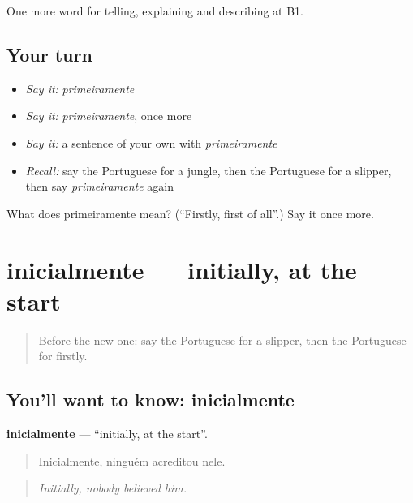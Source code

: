 \begin{grammarlens}[title={What you've built}]
One more word for telling, explaining and describing at B1.
\end{grammarlens}

\subsection*{Your turn}
\begin{itemize}
\raggedright
  \item \emph{Say it:} \emph{primeiramente}
  \item \emph{Say it:} \emph{primeiramente}, once more
  \item \emph{Say it:} a sentence of your own with \emph{primeiramente}
  \item \emph{Recall:} say the Portuguese for a jungle, then the Portuguese for a slipper, then say \emph{primeiramente} again
\end{itemize}

\begin{tcolorbox}[breakable,colback=teal!4,colframe=teal!35!black,title={Before you move on}]
What does primeiramente mean? (\textquotedblleft{}Firstly, first of all\textquotedblright{}.) Say it once more.
\end{tcolorbox}
\section[inicialmente]{inicialmente — initially, at the start}

\label{lesson:PT-C269-inicialmente}



\begin{quote}
Before the new one: say the Portuguese for a slipper, then the Portuguese for firstly.
\end{quote}

\subsection*{You'll want to know: inicialmente}
\textbf{inicialmente} — \textquotedblleft{}initially, at the start\textquotedblright{}.

\begin{quote}
Inicialmente, ninguém acreditou nele.
\end{quote}

\begin{quote}
\emph{Initially, nobody believed him.}
\end{quote}

